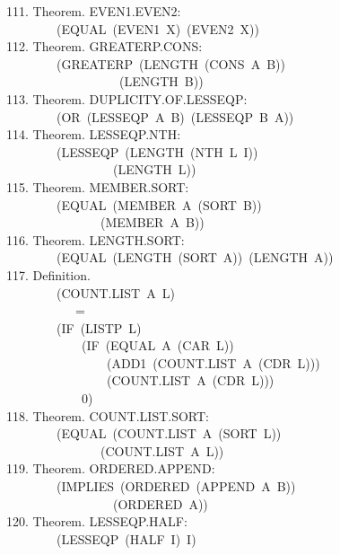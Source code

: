 \documentclass[10pt]{book}
\newenvironment{pubasis}{\begin{flushleft}}{\end{flushleft}}
\begin{document}
\begin{pubasis}
111.    Theorem.  EVEN1.EVEN2:\\
~~~~~~~~(EQUAL~(EVEN1~X)~(EVEN2~X))\\

112.    Theorem.  GREATERP.CONS:\\
~~~~~~~~(GREATERP~(LENGTH~(CONS~A~B))\\
~~~~~~~~~~~~~~~~~~(LENGTH~B))\\

113.    Theorem.  DUPLICITY.OF.LESSEQP:\\
~~~~~~~~(OR~(LESSEQP~A~B)~(LESSEQP~B~A))\\

114.    Theorem.  LESSEQP.NTH:\\
~~~~~~~~(LESSEQP~(LENGTH~(NTH~L~I))\\
~~~~~~~~~~~~~~~~~(LENGTH~L))\\

115.    Theorem.  MEMBER.SORT:\\
~~~~~~~~(EQUAL~(MEMBER~A~(SORT~B))\\
~~~~~~~~~~~~~~~(MEMBER~A~B))\\

116.    Theorem.  LENGTH.SORT:\\
~~~~~~~~(EQUAL~(LENGTH~(SORT~A))~(LENGTH~A))\\

117.    Definition.\\
~~~~~~~~(COUNT.LIST~A~L)\\
~~~~~~~~~~~=\\
~~~~~~~~(IF~(LISTP~L)\\
~~~~~~~~~~~~(IF~(EQUAL~A~(CAR~L))\\
~~~~~~~~~~~~~~~~(ADD1~(COUNT.LIST~A~(CDR~L)))\\
~~~~~~~~~~~~~~~~(COUNT.LIST~A~(CDR~L)))\\
~~~~~~~~~~~~0)\\

118.    Theorem.  COUNT.LIST.SORT:\\
~~~~~~~~(EQUAL~(COUNT.LIST~A~(SORT~L))\\
~~~~~~~~~~~~~~~(COUNT.LIST~A~L))\\

119.    Theorem.  ORDERED.APPEND:\\
~~~~~~~~(IMPLIES~(ORDERED~(APPEND~A~B))\\
~~~~~~~~~~~~~~~~~(ORDERED~A))\\

120.    Theorem.  LESSEQP.HALF:\\
~~~~~~~~(LESSEQP~(HALF~I)~I)\\


\end{pubasis}
\end{document}
